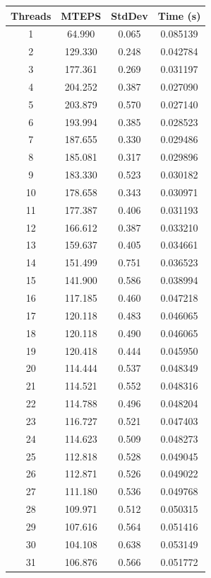 \documentclass[10pt,twocolumn,letterpaper]{article}
\begin{document}
\begin{table}[h]
\renewcommand\arraystretch{0.8}
\centering
\begin{tabular}{@{}c|ccc@{}}
\toprule
Threads          & MTEPS  & StdDev     & Time (s)      \\ \midrule
1 & 64.990 & 0.065 & 0.085139 \\
2 & 129.330 & 0.248 & 0.042784 \\
3 & 177.361 & 0.269 & 0.031197 \\
4 & 204.252 & 0.387 & 0.027090 \\
5 & 203.879 & 0.570 & 0.027140 \\
6 & 193.994 & 0.385 & 0.028523 \\
7 & 187.655 & 0.330 & 0.029486 \\
8 & 185.081 & 0.317 & 0.029896 \\
9 & 183.330 & 0.523 & 0.030182 \\
10 & 178.658 & 0.343 & 0.030971 \\
11 & 177.387 & 0.406 & 0.031193 \\
12 & 166.612 & 0.387 & 0.033210 \\
13 & 159.637 & 0.405 & 0.034661 \\
14 & 151.499 & 0.751 & 0.036523 \\
15 & 141.900 & 0.586 & 0.038994 \\
16 & 117.185 & 0.460 & 0.047218 \\
17 & 120.118 & 0.483 & 0.046065 \\
18 & 120.118 & 0.490 & 0.046065 \\
19 & 120.418 & 0.444 & 0.045950 \\
20 & 114.444 & 0.537 & 0.048349 \\
21 & 114.521 & 0.552 & 0.048316 \\
22 & 114.788 & 0.496 & 0.048204 \\
23 & 116.727 & 0.521 & 0.047403 \\
24 & 114.623 & 0.509 & 0.048273 \\
25 & 112.818 & 0.528 & 0.049045 \\
26 & 112.871 & 0.526 & 0.049022 \\
27 & 111.180 & 0.536 & 0.049768 \\
28 & 109.971 & 0.512 & 0.050315 \\
29 & 107.616 & 0.564 & 0.051416 \\
30 & 104.108 & 0.638 & 0.053149 \\
31 & 106.876 & 0.566 & 0.051772 \\

\end{tabular}
\end{table}
\end{document}

